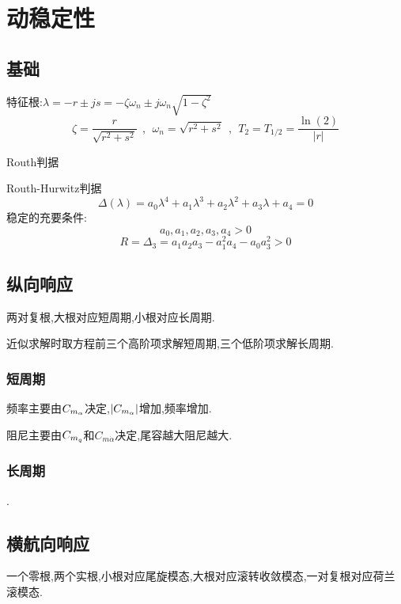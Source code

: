 \chapter{动稳定性}
\section{基础}
特征根:$\lambda=-r\pm js=-\zeta\omega_n\pm j\omega_n\sqrt{1-\zeta^2}$
$$\zeta=\frac{r}{\sqrt{r^2+s^2}}\ \ ,\ \ \omega_n=\sqrt{r^2+s^2}\ \ ,\ \ T_2=T_{1/2}=\frac{\ln(2)}{|r|}$$

Routh判据

Routh-Hurwitz判据
$$\Delta(\lambda)=a_0\lambda^4+a_1\lambda^3+a_2\lambda^2+a_3\lambda+a_4=0$$
稳定的充要条件:
$$a_0,a_1,a_2,a_3,a_4>0$$
$$R=\Delta_3=a_1a_2a_3-a_1^2a_4-a_0a_3^2>0$$

\section{纵向响应}
两对复根,大根对应短周期,小根对应长周期.

近似求解时取方程前三个高阶项求解短周期,三个低阶项求解长周期.
\subsection{短周期}
频率主要由${C_{m_\alpha}}$决定,$|{C_{m_\alpha}}|$增加,频率增加.

阻尼主要由$C_{m_q}$和$C_{m\dot{\alpha}}$决定,尾容越大阻尼越大.

\subsection{长周期}
.

\section{横航向响应}
一个零根,两个实根,小根对应尾旋模态,大根对应滚转收敛模态,一对复根对应荷兰滚模态.

\endinput